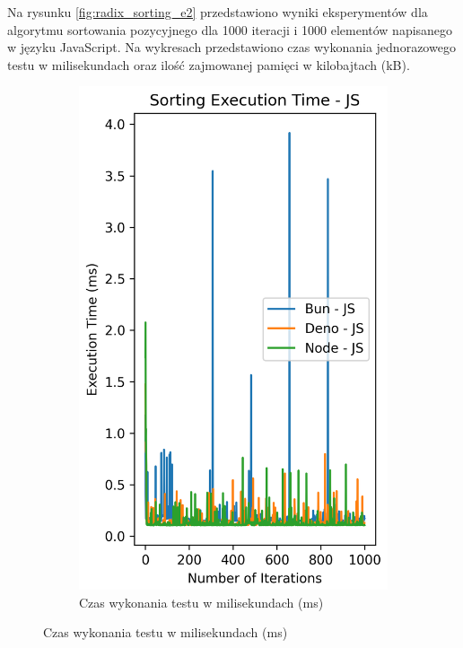 Na rysunku \ref{fig:radix_sorting_e2} przedstawiono wyniki eksperymentów dla algorytmu sortowania pozycyjnego dla 1000 iteracji i 1000 elementów napisanego w języku JavaScript. Na wykresach przedstawiono czas wykonania jednorazowego testu w milisekundach oraz ilość zajmowanej pamięci w kilobajtach (kB).

\begin{figure}[H]
  \centering
  \begin{subfigure}[b]{0.42\textwidth}
    \centering
    \includegraphics[width=\textwidth]{Figures/sorting/sorting_radix_1000_1000_js_time.png}
    \caption{Czas wykonania testu w milisekundach (ms)}
    \label{fig:radix_sorting_e2_time}

\end{subfigure}
\end{figure}
